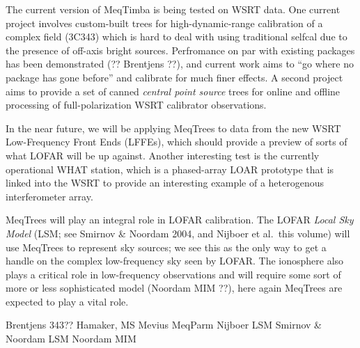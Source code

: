 \documentclass[11pt,twoside]{article}  %
\begin{document}
The current version of MeqTimba is being tested on WSRT data. One current
project involves custom-built trees for high-dynamic-range calibration of a
complex field (3C343) which is hard to deal with using traditional selfcal due
to the presence of off-axis bright sources. Perfromance on par with existing
packages has been demonstrated (?? Brentjens ??), and current work aims to ``go
where no package has gone before'' and calibrate for much finer effects. A
second project aims to provide a set of canned {\em central point source} trees
for online and offline processing of full-polarization WSRT calibrator
observations.

In the near future, we will be applying MeqTrees to data from the new WSRT
Low-Frequency Front Ends (LFFEs), which should provide a preview of sorts of
what LOFAR will be up against. Another interesting test is the currently
operational WHAT station, which is a phased-array LOAR prototype that is linked
into the WSRT to provide an interesting example of a heterogenous interferometer
array.

MeqTrees will play an integral role in LOFAR calibration. The LOFAR {\em Local
Sky Model} (LSM; see Smirnov \& Noordam 2004, and Nijboer et al.\ this volume)
will use MeqTrees to represent sky sources; we see this as the only way to get a
handle on the complex low-frequency sky seen by LOFAR. The ionosphere also plays
a critical role in low-frequency observations and will require some sort of
more or less sophisticated model (Noordam MIM ??), here again MeqTrees are
expected to play a vital role.

\begin{references}

 Brentjens 343??
 Hamaker, MS
 Mevius MeqParm
 Nijboer LSM
 Smirnov \& Noordam LSM
 Noordam MIM

\end{references}
\end{document}

